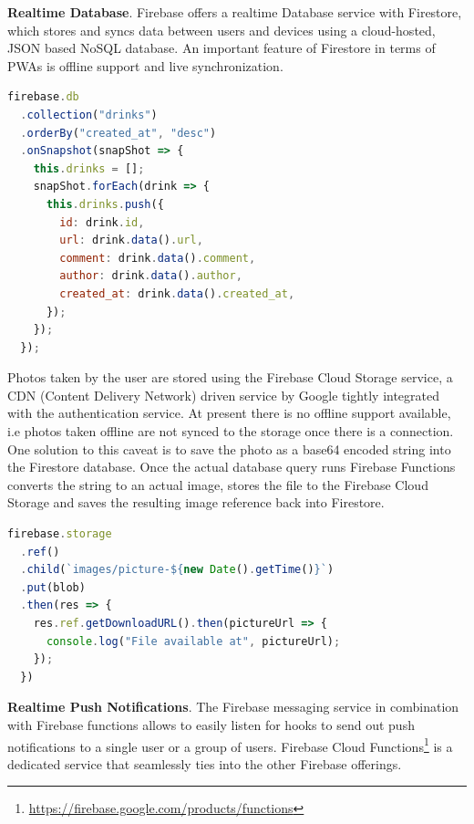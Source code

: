 \textbf{Realtime Database}. Firebase offers a realtime Database service with Firestore, which stores and syncs data between users and devices using a cloud-hosted, JSON based NoSQL database. An important feature of Firestore in terms of PWAs is offline support and live synchronization.

\begin{lstlisting}[language=JavaScript, caption=Realtime query for new posts (Home.vue), label=lst:firebase-listposts]
firebase.db
  .collection("drinks")
  .orderBy("created_at", "desc")
  .onSnapshot(snapShot => {
    this.drinks = [];
    snapShot.forEach(drink => {
      this.drinks.push({
        id: drink.id,
        url: drink.data().url,
        comment: drink.data().comment,
        author: drink.data().author,
        created_at: drink.data().created_at,
      });
    });
  });
\end{lstlisting}

Photos taken by the user are stored using the Firebase Cloud Storage service, a CDN (Content Delivery Network) driven service by Google tightly integrated with the authentication service. At present there is no offline support available, i.e photos taken offline are not synced to the storage once there is a connection. One solution to this caveat is to save the photo as a base64 encoded string into the Firestore database. Once the actual database query runs Firebase Functions converts the string to an actual image, stores the file to the Firebase Cloud Storage and saves the resulting image reference back into Firestore.

\begin{lstlisting}[language=JavaScript, caption=Store a photo to Firebase Cloud Storage (Camera.vue), label=lst:firebase-photos]
firebase.storage
  .ref()
  .child(`images/picture-${new Date().getTime()}`)
  .put(blob)
  .then(res => {
    res.ref.getDownloadURL().then(pictureUrl => {
      console.log("File available at", pictureUrl);
    });
  })
\end{lstlisting}

\textbf{Realtime Push Notifications}. The Firebase messaging service in combination with Firebase functions allows to easily listen for hooks to send out push notifications to a single user or a group of users. Firebase Cloud Functions\footnote{\url{https://firebase.google.com/products/functions}} is a dedicated service that seamlessly ties into the other Firebase offerings.

